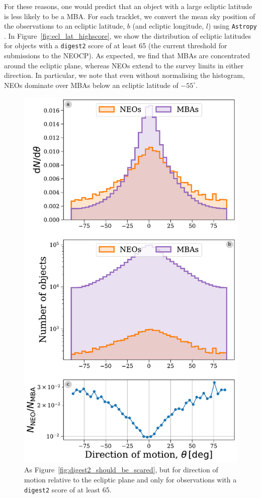 \documentclass[twocolumn, twocolappendix]{aastex631}
\newcommand{\dig}{\texttt{digest2}}
\begin{document}
For these reasons, one would predict that an object with a large ecliptic latitude is less likely to be a MBA. For each tracklet, we convert the mean sky position of the observations to an ecliptic latitude, $b$ (and ecliptic longitude, $l$) using \texttt{Astropy} \citep{astropy:2013,astropy:2018,astropy:2022}. In Figure~\ref{fig:ecl_lat_highscore}, we show the distribution of ecliptic latitudes for objects with a \dig{} score of at least 65 (the current threshold for submissions to the NEOCP). As expected, we find that MBAs are concentrated around the ecliptic plane, whereas NEOs extend to the survey limits in either direction. In particular, we note that even without normalising the histogram, NEOs dominate over MBAs below an ecliptic latitude of $-55^{\circ}$.

\begin{figure}[htb]
    \centering
    \includegraphics[width=\columnwidth]{figures/direction_dist_highscore.pdf}
    \caption{As Figure~\ref{fig:digest2_should_be_scared}, but for direction of motion relative to the ecliptic plane and only for observations with a \dig{} score of at least 65.}
    \label{fig:dir_highscore}
\end{figure}
\end{document}
